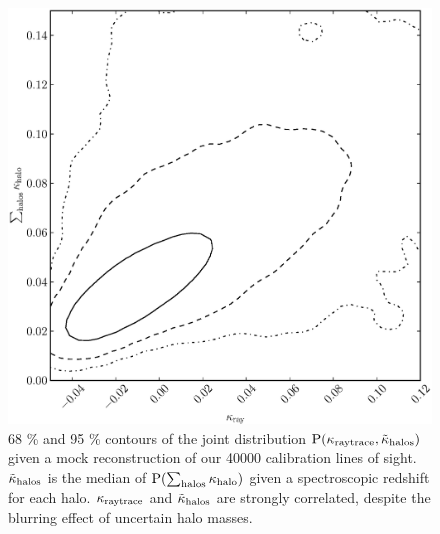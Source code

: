 \documentclass[useAMS,usenatbib]{mn2e}
\begin{document}
\begin{figure}
\includegraphics[width=\columnwidth]{cornerplot.eps}
\caption{68 \% and 95 \% contours of the joint distribution ${\rm P}(\kappa_{\rm raytrace}, \tilde\kappa_{\rm halos})$ given a mock reconstruction of our 40000 calibration lines of sight. $\tilde\kappa_{\rm halos}$ is the median of ${\rm P}(\sum_{\rm halos} \kappa_{\rm halo})$ given a spectroscopic redshift for each halo. $\kappa_{\rm raytrace}$ and $\tilde\kappa_{\rm halos}$ are strongly correlated, despite the blurring effect of uncertain halo masses.}
\label{fig:corner}
\end{figure}
\end{document}
